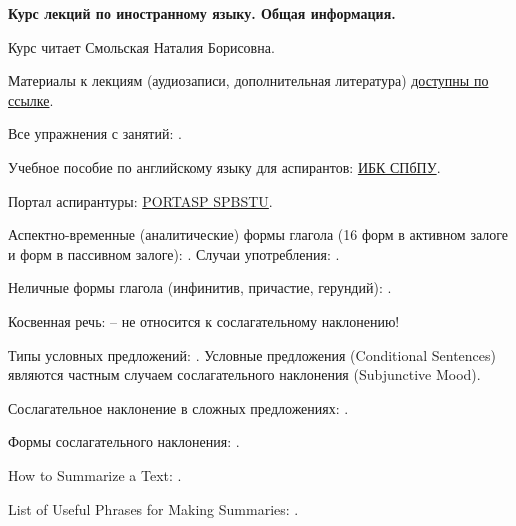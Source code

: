\documentclass[main.tex]{subfiles}
\begin{document}
{\parindent0pt

\textbf{Курс лекций по иностранному языку. Общая информация.}

\vspace{3pt}

Курс читает Смольская Наталия Борисовна.

Материалы к лекциям (аудиозаписи, дополнительная литература) \href{https://drive.google.com/drive/folders/1iSx2EjJJ98rhPpOsM4xGcJA7-7qitQHM?usp=sharing}{доступны по ссылке}.

Все упражнения с занятий: \hyperref[sec:all-tasks-lk]{\color{blue}{УПРАЖНЕНИЯ}}.

Учебное пособие по английскому языку для аспирантов: \href{https://elib.spbstu.ru/dl/2/s19-119.pdf/info}{ИБК СПбПУ}.

Портал аспирантуры: \href{https://portasp.spbstu.ru/login/index.php}{PORTASP SPBSTU}.

\vspace{3pt}

Аспектно-временные (аналитические) формы глагола (16 форм в активном залоге и  форм в пассивном залоге): \hyperref[subsec:tenses-aspects-full-table-local]{\color{blue}{Tenses and Aspects}}.
Случаи употребления: \hyperref[subsec:tenses-usage]{\color{blue}{Tenses Usage}}.

\vspace{3pt}

Неличные формы глагола (инфинитив, причастие, герундий): \hyperref[subsec:impersonal-lk]{\color{blue}{Impersonal Forms}}.

\vspace{3pt}

Косвенная речь: \hyperref[subsec:reported-speech]{\color{blue}{Reported Speech}} -- не относится к сослагательному наклонению!

\vspace{3pt}

Типы условных предложений: \hyperref[subsec:conditionals-types]{\color{blue}{Conditionals}}. Условные предложения (Conditional Sentences) являются частным случаем сослагательного наклонения (Subjunctive Mood).

\vspace{3pt}

Сослагательное наклонение в сложных предложениях: \hyperref[subsec:subjunctive-mood-lk]{\color{blue}{Subjunctive Mood}}.

Формы сослагательного наклонения: \hyperlink{subjunctive-mood-forms-table}{\color{blue}{Subjunctive Mood Forms}}.

\vspace{3pt}

How to Summarize a Text: \hyperref[subsec:tips-on-summarizing]{\color{blue}{Tips On Summarizing}}.

List of Useful Phrases for Making Summaries: \hyperref[subsec:list-of-useful-phrases-for-making-summaries]{\color{blue}{List Of Phrases}}.

}
\end{document}
